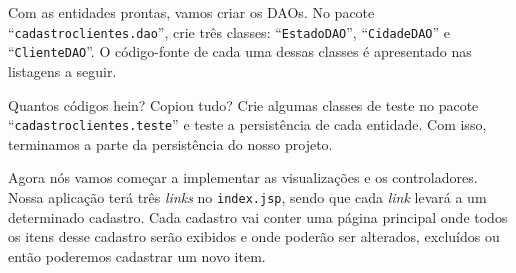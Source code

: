 

Com as entidades prontas, vamos criar os DAOs. No pacote ``\texttt{cadastroclientes.dao}'', crie três classes: ``\texttt{EstadoDAO}'', ``\texttt{CidadeDAO}'' e ``\texttt{ClienteDAO}''. O código-fonte de cada uma dessas classes é apresentado nas listagens a seguir.




Quantos códigos hein? Copiou tudo? Crie algumas classes de teste no pacote\linebreak%
``\texttt{cadastroclientes.teste}'' e teste a persistência de cada entidade. Com isso, terminamos a parte da persistência do nosso projeto.

Agora nós vamos começar a implementar as visualizações e os controladores. Nossa aplicação terá três \textit{links} no \texttt{index.jsp}, sendo que cada \textit{link} levará a um determinado cadastro. Cada cadastro vai conter uma página principal onde todos os itens desse cadastro serão exibidos e onde poderão ser alterados, excluídos ou então poderemos cadastrar um novo item.

